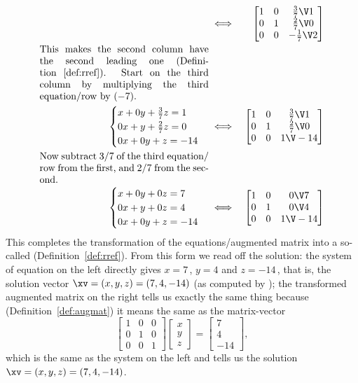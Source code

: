 \begin{example}
\begin{solution}
\begin{eqnarray*}
&\iff&%
\begin{bmatrix} 1&0&\frac37\V1\\0&1&\frac27\V0\\0&0&-\frac17\V2 \end{bmatrix}
\\
\parbox{0.5\linewidth}{This makes the second column have the second leading one (Definition~\ref{def:rref}).  
Start on the third column by multiplying the third equation\slash row by~\((-7)\).}
\\
\begin{cases}
x+0y+\frac37z=1\\ 0x+y+\frac27z=0\\ 0x+0y+z=-14
\end{cases}
&\iff&%
\begin{bmatrix} 1&0&\frac37\V1\\0&1&\frac27\V0\\0&0&1\V-14 \end{bmatrix}
\\
\parbox{0.5\linewidth}{Now subtract \(3/7\)~of the third equation\slash row from the first, and \(2/7\) from the second.}
\\
\begin{cases}
x+0y+0z=7\\ 0x+y+0z=4\\ 0x+0y+z=-14
\end{cases}
&\iff&%
\begin{bmatrix} 1&0&0\V7\\0&1&0\V4\\0&0&1\V-14 \end{bmatrix}
\end{eqnarray*}
This completes the transformation of the equations\slash augmented matrix into a so-called  (Definition~\ref{def:rref}).
From this form we read off the solution:  the system of equation on the left directly gives \(x=7\)\,, \(y=4\) and \(z=-14\)\,, that is, the solution vector \(\xv=(x,y,z)=(7,4,-14)\) (as computed by \script);
the transformed augmented matrix on the right tells us exactly the same thing because (Definition~\ref{def:augmat}) it means the same as the matrix-vector 
\begin{equation*}
\begin{bmatrix} 1&0&0\\0&1&0\\0&0&1 \end{bmatrix}
\begin{bmatrix} x\\y\\z \end{bmatrix}
=\begin{bmatrix} 7\\4\\-14 \end{bmatrix},
\end{equation*}
which is the same as the system on the left and tells us the solution \(\xv=(x,y,z)=(7,4,-14)\).
\end{solution}
\end{example}





